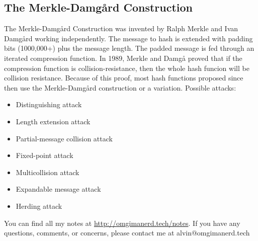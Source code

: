 \documentclass{math}
\begin{document}
\subsection*{The Merkle-Damg{\aa}rd Construction}
The Merkle-Damg{\aa}rd Construction was invented by Ralph Merkle and Ivan
Damg{\aa}rd working independently. The message to hash is extended with padding
bits (1000,000+) plus the message length. The padded message is fed through an
iterated compression function. In 1989, Merkle and Damg{\aa} proved that if
the compression function is collision-resistance, then the whole hash funcion
will be collision resistance. Because of this proof, most hash functions
proposed since then use the Merkle-Damg{\aa}rd construction or a variation.
Possible attacks:
\begin{itemize}
  \item Distinguishing attack
  \item Length extension attack
  \item Partial-message collision attack
  \item Fixed-point attack
  \item Multicollision attack
  \item Expandable message attack
  \item Herding attack
\end{itemize}

\begin{center}
  You can find all my notes at \url{http://omgimanerd.tech/notes}. If you have
  any questions, comments, or concerns, please contact me at
  alvin@omgimanerd.tech
\end{center}
\end{document}
